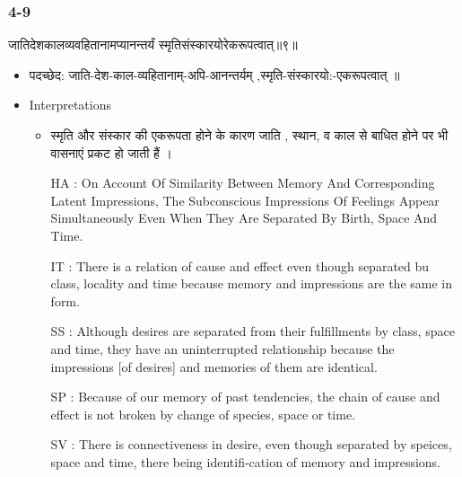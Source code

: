 \begin{frame}[fragile]\frametitle{4-9}
\begin{sanskrit}
जातिदेशकालव्यवहितानामप्यानन्तर्यं स्मृतिसंस्कारयोरेकरूपत्वात्॥९॥
\end{sanskrit}

	\begin{itemize}
	\item पदच्छेद:  जाति-देश-काल-व्यहितानाम्-अपि-‌आनन्तर्यम् ,स्मृति-संस्कारयो:-एकरूपत्वात् ॥
	\item Interpretations
		\begin{itemize}	
		\item स्मृति और संस्कार की एकरूपता होने के कारण जाति , स्थान, व काल से बाधित होने पर भी वासनाएं प्रकट हो जाती हैं ।
		\item [HA]: On Account Of Similarity Between Memory And Corresponding Latent Impressions, The Subconscious Impressions Of Feelings Appear Simultaneously Even When They Are Separated By Birth, Space And Time.
		\item [IT]: There is a relation of cause and effect even though separated bu class, locality and time because memory and impressions are the same in form.
		\item [SS]: Although desires are separated from their fulfillments by class, space and time, they have an uninterrupted relationship because the impressions [of desires] and memories of them are identical.
		\item [SP]: Because of our memory of past tendencies, the chain of cause and effect is not broken by change of species, space or time.
		\item [SV]: There is connectiveness in desire, even though separated by speices, space and time, there being identifi-cation of memory and impressions. 
		\end{itemize}
	\end{itemize}
\end{frame}


